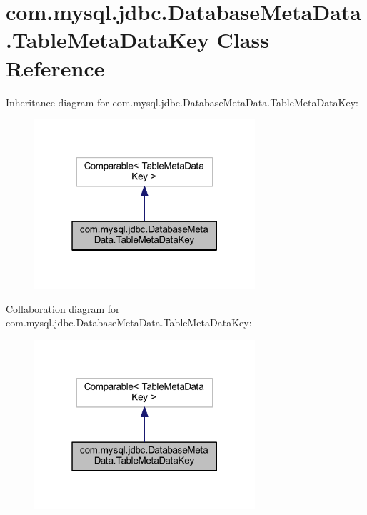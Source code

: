 \hypertarget{classcom_1_1mysql_1_1jdbc_1_1_database_meta_data_1_1_table_meta_data_key}{}\section{com.\+mysql.\+jdbc.\+Database\+Meta\+Data.\+Table\+Meta\+Data\+Key Class Reference}
\label{classcom_1_1mysql_1_1jdbc_1_1_database_meta_data_1_1_table_meta_data_key}


Inheritance diagram for com.\+mysql.\+jdbc.\+Database\+Meta\+Data.\+Table\+Meta\+Data\+Key\+:
\nopagebreak
\begin{figure}[H]
\begin{center}
\leavevmode
\includegraphics[width=232pt]{classcom_1_1mysql_1_1jdbc_1_1_database_meta_data_1_1_table_meta_data_key__inherit__graph}
\end{center}
\end{figure}


Collaboration diagram for com.\+mysql.\+jdbc.\+Database\+Meta\+Data.\+Table\+Meta\+Data\+Key\+:
\nopagebreak
\begin{figure}[H]
\begin{center}
\leavevmode
\includegraphics[width=232pt]{classcom_1_1mysql_1_1jdbc_1_1_database_meta_data_1_1_table_meta_data_key__coll__graph}
\end{center}
\end{figure}
